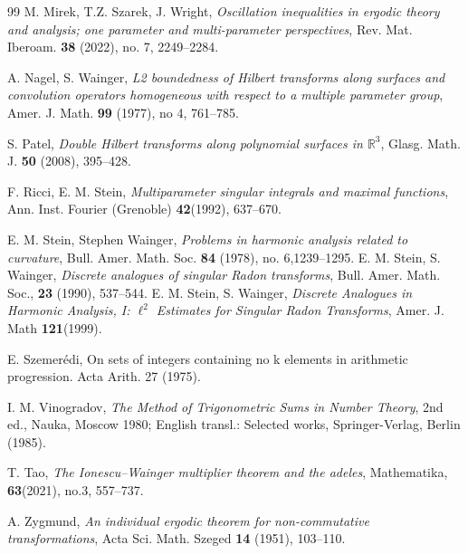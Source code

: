 \documentclass[11 pt,letterpaper]{amsart}
\theoremstyle{plain}
\theoremstyle{definition}
\theoremstyle{remark} \theoremstyle{exam} \theoremstyle{ob}
\numberwithin{equation}{section}
\begin{document}
\begin{thebibliography}{99}
 M. Mirek, T.Z. Szarek, J. Wright, \emph{Oscillation inequalities in ergodic theory and analysis; one parameter
and multi-parameter perspectives}, Rev. Mat. Iberoam. \textbf{38} (2022), no. 7,  2249--2284. 
 
 A. Nagel,  S. Wainger, \emph{L2 boundedness of Hilbert transforms along surfaces
and convolution operators homogeneous with respect to a multiple parameter group}, Amer. J.
Math. \textbf{99} (1977), no  4, 761--785. 


 
 S. Patel,  \emph{Double Hilbert transforms along polynomial surfaces in $\mathbb{R}^3$},  {Glasg. Math. J.} \textbf{50} (2008),
 395--428.
 
   F. Ricci, E. M. Stein, \emph{Multiparameter singular integrals and maximal functions}, Ann. Inst. Fourier (Grenoble)  \textbf{42}(1992), 637--670.
 
  
 E. M. Stein, Stephen Wainger, \emph{Problems in harmonic analysis related to curvature}, Bull. Amer. Math. Soc. \textbf{84} (1978), no.  6,1239--1295.
   E. M. Stein, S. Wainger, \emph{Discrete analogues of singular Radon transforms},  Bull. Amer. Math. Soc., \textbf{23} (1990), 537–544.
  E. M. Stein, S. Wainger, \emph{Discrete Analogues in Harmonic Analysis, I:  $\ell^2$ Estimates for Singular Radon Transforms}, Amer. J. Math \textbf{121}(1999).
 
 	 E. Szemerédi, On sets of integers containing no k elements in arithmetic progression. Acta Arith. 27 (1975).
 
 
   I. M. Vinogradov, \emph{The Method of Trigonometric Sums in Number Theory},  2nd
ed., Nauka, Moscow 1980; English transl.:  Selected works, Springer-Verlag,
Berlin (1985).
 
 
 T. Tao, \emph{The Ionescu–Wainger multiplier theorem and the adeles}, Mathematika, \textbf{63}(2021), no.3, 557--737.

 A. Zygmund, \emph{An individual ergodic theorem for non-commutative transformations}, Acta Sci. Math. Szeged \textbf{14}
(1951),   103--110.







\end{thebibliography}


 
\end{document}
